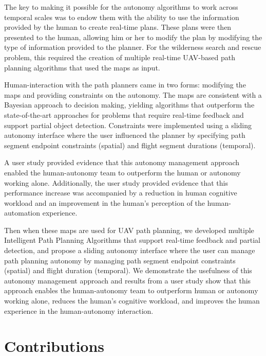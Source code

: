 The key to making it possible for the autonomy algorithms to work across temporal scales was to endow them with the ability to use the information provided by the human to create real-time plans.  These plans were then presented to the human, allowing him or her to modify the plan by modifying the type of information provided to the planner.  For the wilderness search and rescue problem, this required the creation of multiple real-time UAV-based path planning algorithms that used the maps as input.  

Human-interaction with the path planners came in two forms: modifying the maps and providing constraints on the autonomy. The maps are consistent with a Bayesian approach to decision making, yielding algorithms that outperform the state-of-the-art approaches for problems that require real-time feedback and support partial object detection.  Constraints were implemented using a sliding autonomy interface where the user influenced the planner by specifying path segment endpoint constraints (spatial) and flight segment durations (temporal).

A user study provided evidence that this autonomy management approach enabled the human-autonomy team to outperform the human or autonomy working alone.  Additionally, the user study provided evidence that this performance increase was accompanied by a reduction in human cognitive workload and an improvement in the human's perception of the human-automation experience.



Then when these maps are used for UAV path planning, we developed multiple Intelligent Path Planning Algorithms that support real-time feedback and partial detection, and propose a sliding autonomy interface where the user can manage path planning autonomy by managing path segment endpoint constraints (spatial) and flight duration (temporal). We demonstrate the usefulness of this autonomy management approach and results from a user study show that this approach enables the human-autonomy team to outperform human or autonomy working alone, reduces the human's cognitive workload, and improves the human experience in the human-autonomy interaction.

\section{Contributions}
\label{contributions}

